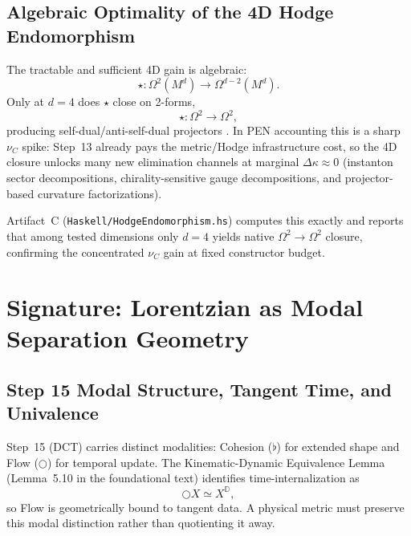 \documentclass[12pt,a4paper]{article}
\theoremstyle{definition}
\newcommand{\flatmod}{\flat}
\newcommand{\nextmod}{\bigcirc}
\begin{document}
\subsection{Algebraic Optimality of the 4D Hodge Endomorphism}

The tractable and sufficient 4D gain is algebraic:
\begin{equation}
\star : \Omega^2(M^d) \to \Omega^{d-2}(M^d).
\end{equation}
Only at $d=4$ does $\star$ close on 2-forms,
\begin{equation}
\star : \Omega^2 \to \Omega^2,
\end{equation}
producing self-dual/anti-self-dual projectors \cite{atiyah-hitchin-singer,donaldson-kronheimer}. In PEN accounting this is a sharp $\nu_C$ spike: Step~13 already pays the metric/Hodge infrastructure cost, so the 4D closure unlocks many new elimination channels at marginal $\Delta\kappa\approx 0$ (instanton sector decompositions, chirality-sensitive gauge decompositions, and projector-based curvature factorizations).

Artifact~C (\texttt{Haskell/HodgeEndomorphism.hs}) computes this exactly and reports that among tested dimensions only $d=4$ yields native $\Omega^2\to\Omega^2$ closure, confirming the concentrated $\nu_C$ gain at fixed constructor budget.

\begin{center}
\end{center}

\section{Signature: Lorentzian as Modal Separation Geometry}

\subsection{Step 15 Modal Structure, Tangent Time, and Univalence}

Step~15 (DCT) carries distinct modalities: Cohesion ($\flatmod$) for extended shape and Flow ($\nextmod$) for temporal update. The Kinematic-Dynamic Equivalence Lemma (Lemma~5.10 in the foundational text) identifies time-internalization as
\begin{equation}
\nextmod X \simeq X^{\mathbb{D}},
\end{equation}
so Flow is geometrically bound to tangent data. A physical metric must preserve this modal distinction rather than quotienting it away.
\end{document}

